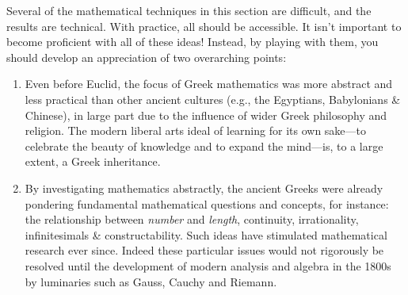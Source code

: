 Several of the mathematical techniques in this section are difficult, and the results are technical. With practice, all should be accessible. It isn't important to become proficient with all of these ideas! Instead, by playing with them, you should develop an appreciation of two overarching points:
\begin{enumerate}
  \item Even before Euclid, the focus of Greek mathematics was more abstract and less practical than other ancient cultures (e.g., the Egyptians, Babylonians \& Chinese), in large part due to the influence of wider Greek philosophy and religion. The modern liberal arts ideal of learning for its own sake---to celebrate the beauty of knowledge and to expand the mind---is, to a large extent, a Greek inheritance. 
  \item By investigating mathematics abstractly, the ancient Greeks were already pondering fundamental mathematical questions and concepts, for instance: the relationship between \emph{number} and \emph{length}, continuity, irrationality, infinitesimals \& constructability.
  Such ideas have stimulated mathematical research ever since. Indeed these particular issues would not rigorously be resolved until the development of modern analysis and algebra in the 1800s by luminaries such as Gauss, Cauchy and Riemann.
\end{enumerate}


\clearpage


